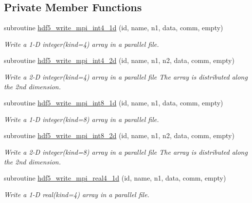 \subsection*{Private Member Functions}
\begin{DoxyCompactItemize}
\item 
subroutine \hyperlink{interfacemodhdf5_1_1hdf5__write__mpi__data_a7ea09115ff2a974a7d871c555b1be2d0}{hdf5\+\_\+write\+\_\+mpi\+\_\+int4\+\_\+1d} (id, name, n1, data, comm, empty)
\begin{DoxyCompactList}\small\item\em Write a 1-\/D integer(kind=4) array in a parallel file. \end{DoxyCompactList}\item 
subroutine \hyperlink{interfacemodhdf5_1_1hdf5__write__mpi__data_a2906d576070456a5137a6e0abe667156}{hdf5\+\_\+write\+\_\+mpi\+\_\+int4\+\_\+2d} (id, name, n1, n2, data, comm, empty)
\begin{DoxyCompactList}\small\item\em Write a 2-\/D integer(kind=4) array in a parallel file The array is distributed along the 2nd dimension. \end{DoxyCompactList}\item 
subroutine \hyperlink{interfacemodhdf5_1_1hdf5__write__mpi__data_a9e1ae706eda63ff5c0be30ee69ec560a}{hdf5\+\_\+write\+\_\+mpi\+\_\+int8\+\_\+1d} (id, name, n1, data, comm, empty)
\begin{DoxyCompactList}\small\item\em Write a 1-\/D integer(kind=8) array in a parallel file. \end{DoxyCompactList}\item 
subroutine \hyperlink{interfacemodhdf5_1_1hdf5__write__mpi__data_a16185b9e0e6ab2aaaff9c931f4554e3a}{hdf5\+\_\+write\+\_\+mpi\+\_\+int8\+\_\+2d} (id, name, n1, n2, data, comm, empty)
\begin{DoxyCompactList}\small\item\em Write a 2-\/D integer(kind=8) array in a parallel file The array is distributed along the 2nd dimension. \end{DoxyCompactList}\item 
subroutine \hyperlink{interfacemodhdf5_1_1hdf5__write__mpi__data_abbbc965c3da38a9f6ba1a37d18f1384a}{hdf5\+\_\+write\+\_\+mpi\+\_\+real4\+\_\+1d} (id, name, n1, data, comm, empty)
\begin{DoxyCompactList}\small\item\em Write a 1-\/D real(kind=4) array in a parallel file. \end{DoxyCompactList}\item 

\end{DoxyCompactItemize}
